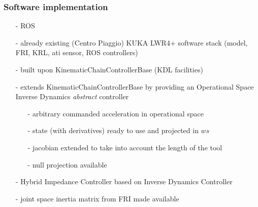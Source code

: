 \begin{frame}
  \frametitle{Software implementation}

  \begin{itemize}
  \item[-] ROS
  \item[-] already existing (Centro Piaggio) KUKA LWR4+ software stack (model, FRI, KRL, ati sensor, ROS controllers)
  \item[-] built upon KinematicChainControllerBase (KDL facilities)
  \item[-] extends KinematicChainControllerBase by providing an Operational Space Inverse Dynamics \emph{abstract} controller
    \begin{itemize}
    \item[-] arbitrary commanded acceleration in operational space
    \item[-] state (with derivatives) ready to use and projected in $ws$
    \item[-] jacobian extended to take into account the length of the tool
    \item[-] null projection available
    \end{itemize}
  \item[-] Hybrid Impedance Controller based on Inverse Dynamics Controller
  \item[-] joint space inertia matrix from FRI made available
  \end{itemize}

\end{frame}
